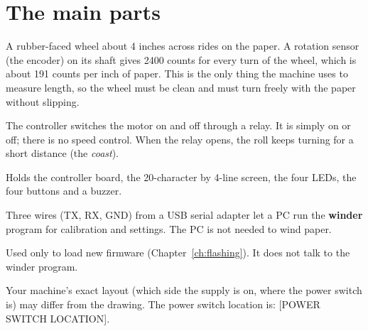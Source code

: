 \section*{The main parts}
\begin{description}[style=nextline,leftmargin=1.5em]
  \item[Measuring wheel and encoder]
    A rubber-faced wheel about 4 inches across rides on the paper. A
    rotation sensor (the encoder) on its shaft gives 2400 counts for every
    turn of the wheel, which is about 191 counts per inch of paper. This is
    the only thing the machine uses to measure length, so the wheel must be
    clean and must turn freely with the paper without slipping.
  \item[Motor and relay]
    The controller switches the motor on and off through a relay. It is
    simply on or off; there is no speed control. When the relay opens, the
    roll keeps turning for a short distance (the \emph{coast}).
  \item[Control box]
    Holds the controller board, the 20-character by 4-line screen, the four
    LEDs, the four buttons and a buzzer.
  \item[Serial connection]
    Three wires (TX, RX, GND) from a USB serial adapter let a PC run the
    \textbf{winder} program for calibration and settings. The PC is not needed
    to wind paper.
  \item[USB port on the controller]
    Used only to load new firmware (Chapter~\ref{ch:flashing}). It does not
    talk to the winder program.
\end{description}

\begin{note}
Your machine's exact layout (which side the supply is on, where the power
switch is) may differ from the drawing. The power switch location is:
[POWER SWITCH LOCATION].
\end{note}
